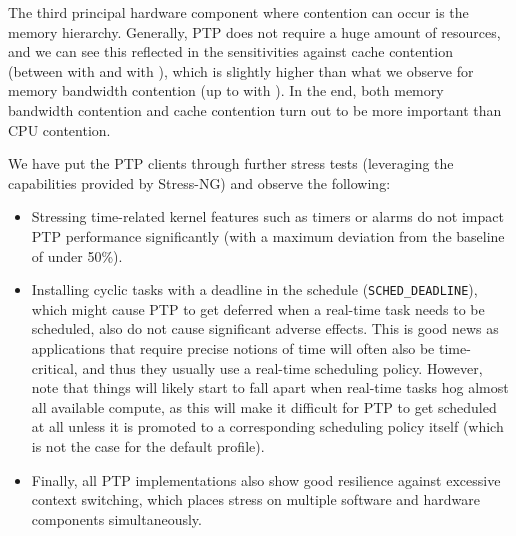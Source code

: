%
%
The third principal hardware component where contention can occur is the memory hierarchy. Generally, PTP does not require a huge amount of resources, and we can see this reflected in the sensitivities against cache contention (between \fRatio[1]{\cmpMin} with \fVendorCluster{\cmpMaxArg} and \fRatio[1]{\cmpMax} with \fVendorCluster{\cmpMaxArg}),%
%
%
which is slightly higher than what we observe for memory bandwidth contention (up to \fRatio{\cmpMax} with \fVendorCluster{\cmpMaxArg}).
%
In the end, both memory bandwidth contention and cache contention turn out to be more important than CPU contention.%
%

We have put the PTP clients through further stress tests (leveraging the capabilities provided by Stress-NG) and observe the following:%
\begin{itemize}
    \item Stressing time-related kernel features such as timers or alarms do not impact PTP performance significantly (with a maximum deviation from the baseline of under 50\%).
    \item Installing cyclic tasks with a deadline in the schedule (\texttt{SCHED\_DEADLINE}), which might cause PTP to get deferred when a real-time task needs to be scheduled, also do not cause significant adverse effects. This is good news as applications that require precise notions of time will often also be time-critical, and thus they usually use a real-time scheduling policy. However, note that things will likely start to fall apart when real-time tasks hog almost all available compute, as this will make it difficult for PTP to get scheduled at all unless it is promoted to a corresponding scheduling policy itself (which is not the case for the default profile).
    \item Finally, all PTP implementations also show good resilience against excessive context switching, which places stress on multiple software and hardware components simultaneously.
\end{itemize}

